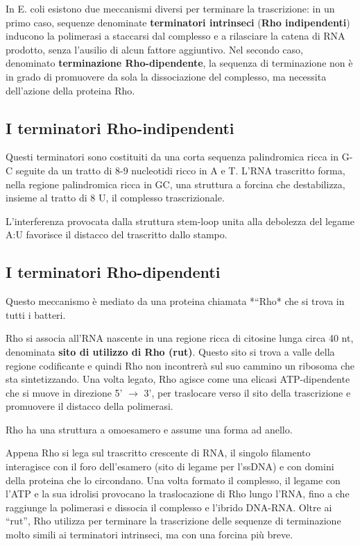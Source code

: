 \documentclass[11pt]{book}
\begin{document}
In E. coli esistono due meccanismi diversi per terminare la
trascrizione: in un primo caso, sequenze denominate \textbf{terminatori
intrinseci} (\textbf{Rho indipendenti}) inducono la polimerasi a
staccarsi dal complesso e a rilasciare la catena di RNA prodotto, senza
l'ausilio di alcun fattore aggiuntivo. Nel secondo caso, denominato
\textbf{terminazione Rho-dipendente}, la sequenza di terminazione non è
in grado di promuovere da sola la dissociazione del complesso, ma
necessita dell'azione della proteina Rho.

\subsection{I terminatori
Rho-indipendenti}\label{i-terminatori-rho-indipendenti}

Questi terminatori sono costituiti da una corta sequenza palindromica
ricca in G-C seguite da un tratto di 8-9 nucleotidi ricco in A e T.
L'RNA trascritto forma, nella regione palindromica ricca in GC, una
struttura a forcina che destabilizza, insieme al tratto di 8 U, il
complesso trascrizionale.

L'interferenza provocata dalla struttura stem-loop unita alla debolezza
del legame A:U favorisce il distacco del trascritto dallo stampo.

\subsection{I terminatori
Rho-dipendenti}\label{i-terminatori-rho-dipendenti}

Questo meccanismo è mediato da una proteina chiamata *``Rho* che si
trova in tutti i batteri.

Rho si associa all'RNA nascente in una regione ricca di citosine lunga
circa 40 nt, denominata \textbf{sito di utilizzo di Rho (rut)}. Questo
sito si trova a valle della regione codificante e quindi Rho non
incontrerà sul suo cammino un ribosoma che sta sintetizzando. Una volta
legato, Rho agisce come una elicasi ATP-dipendente che si muove in
direzione 5' \(\rightarrow\) 3', per traslocare verso il sito della
trascrizione e promuovere il distacco della polimerasi.

Rho ha una struttura a omoesamero e assume una forma ad anello.

Appena Rho si lega sul trascritto crescente di RNA, il singolo filamento
interagisce con il foro dell'esamero (sito di legame per l'ssDNA) e con
domini della proteina che lo circondano. Una volta formato il complesso,
il legame con l'ATP e la sua idrolisi provocano la traslocazione di Rho
lungo l'RNA, fino a che raggiunge la polimerasi e dissocia il complesso
e l'ibrido DNA-RNA. Oltre ai ``rut'', Rho utilizza per terminare la
trascrizione delle sequenze di terminazione molto simili ai terminatori
intrinseci, ma con una forcina più breve.
\end{document}
